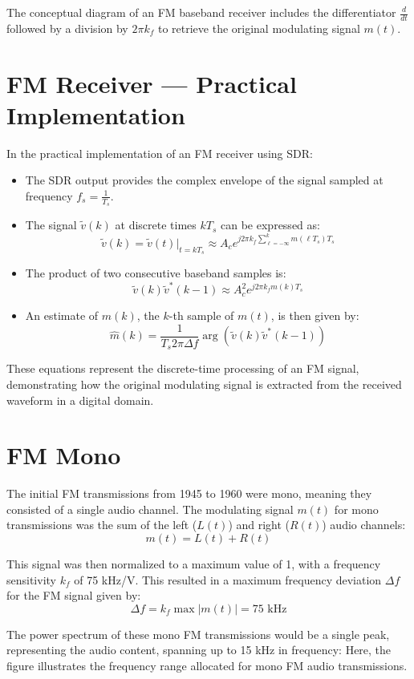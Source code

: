 The conceptual diagram of an FM baseband receiver includes the differentiator \( \frac{d}{dt} \) followed by a division by \( 2\pi k_f \) to retrieve the original modulating signal \( m(t) \).

\section*{FM Receiver — Practical Implementation}

In the practical implementation of an FM receiver using SDR:

\begin{itemize}
    \item The SDR output provides the complex envelope of the signal sampled at frequency \( f_s = \frac{1}{T_s} \).
    \item The signal \( \tilde{v}(k) \) at discrete times \( kT_s \) can be expressed as:
    \[
    \tilde{v}(k) = \tilde{v}(t)|_{t=kT_s} \approx A_c e^{j2\pi k_f \sum_{\ell=-\infty}^{k} m(\ell T_s) T_s}
    \]
    \item The product of two consecutive baseband samples is:
    \[
    \tilde{v}(k) \tilde{v}^*(k - 1) \approx A_c^2 e^{j2\pi k_f m(k) T_s}
    \]
    \item An estimate of \( m(k) \), the \( k \)-th sample of \( m(t) \), is then given by:
    \[
    \hat{m}(k) = \frac{1}{T_s 2\pi \Delta f} \arg(\tilde{v}(k) \tilde{v}^*(k - 1))
    \]
\end{itemize}

These equations represent the discrete-time processing of an FM signal, demonstrating how the original modulating signal is extracted from the received waveform in a digital domain.

\section*{FM Mono}

The initial FM transmissions from 1945 to 1960 were mono, meaning they consisted of a single audio channel. The modulating signal \( m(t) \) for mono transmissions was the sum of the left (\( L(t) \)) and right (\( R(t) \)) audio channels:
\[ m(t) = L(t) + R(t) \]

This signal was then normalized to a maximum value of 1, with a frequency sensitivity \( k_f \) of 75 kHz/V. This resulted in a maximum frequency deviation \( \Delta f \) for the FM signal given by:
\[ \Delta f = k_f \max|m(t)| = 75 \text{ kHz} \]

The power spectrum of these mono FM transmissions would be a single peak, representing the audio content, spanning up to 15 kHz in frequency:
Here, the figure illustrates the frequency range allocated for mono FM audio transmissions.

